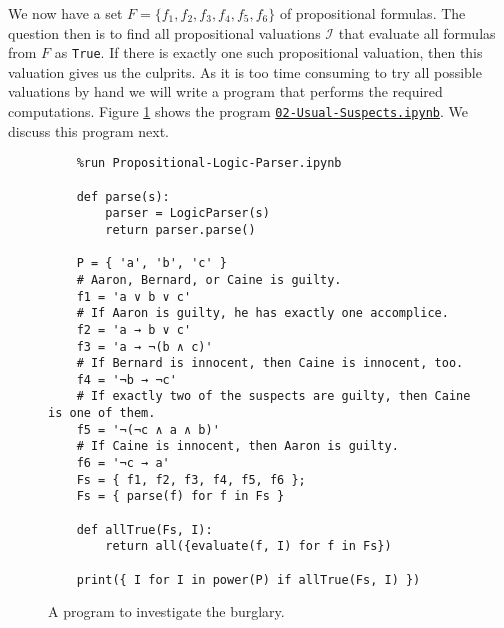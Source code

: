 We now have a set $F = \{ f_1, f_2, f_3, f_4, f_5, f_6 \}$ of propositional formulas.
The question then is to find all propositional valuations $\mathcal{I}$ that evaluate all formulas from $F$ as
\texttt{True}.  If there is exactly one such propositional valuation, then this valuation gives us the culprits.
As it is too time consuming to try all possible valuations by hand we will write a program that performs the
required computations.
Figure \ref{fig:Usual-Suspects.ipynb} shows the program
\href{https://github.com/karlstroetmann/Logic/blob/master/Python/Chapter-4/02-Usual-Suspects.ipynb}{\texttt{02-Usual-Suspects.ipynb}}.
We discuss this program next.

\begin{figure}[!ht]
  \centering
\begin{verbatim}
    %run Propositional-Logic-Parser.ipynb

    def parse(s):
        parser = LogicParser(s) 
        return parser.parse()   
    
    P = { 'a', 'b', 'c' }
    # Aaron, Bernard, or Caine is guilty.
    f1 = 'a ∨ b ∨ c'
    # If Aaron is guilty, he has exactly one accomplice.
    f2 = 'a → b ∨ c'
    f3 = 'a → ¬(b ∧ c)'
    # If Bernard is innocent, then Caine is innocent, too.
    f4 = '¬b → ¬c'
    # If exactly two of the suspects are guilty, then Caine is one of them.
    f5 = '¬(¬c ∧ a ∧ b)'
    # If Caine is innocent, then Aaron is guilty.
    f6 = '¬c → a'
    Fs = { f1, f2, f3, f4, f5, f6 };
    Fs = { parse(f) for f in Fs }

    def allTrue(Fs, I):
        return all({evaluate(f, I) for f in Fs})

    print({ I for I in power(P) if allTrue(Fs, I) })
\end{verbatim}
\vspace*{-0.3cm}
  \caption{A program to investigate the burglary.}
  \label{fig:Usual-Suspects.ipynb}
\end{figure}

